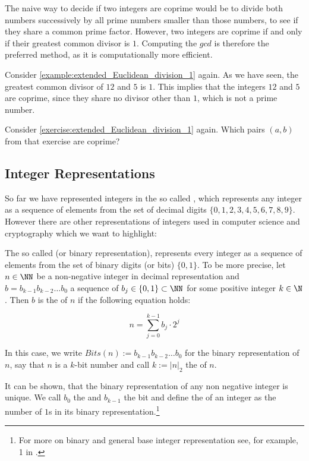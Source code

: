 The naive way to decide if two integers are coprime would be to divide both numbers successively by all prime numbers smaller than those numbers, to see if they share a common prime factor. However, two integers are coprime if and only if their greatest common divisor is $1$.  Computing the $gcd$ is therefore the preferred method, as it is computationally more efficient.

\begin{example} Consider \examplename{} \ref{example:extended_Euclidean_division_1} again. As we have seen, the greatest common divisor of $12$ and $5$ is $1$. This implies that the integers $12$ and $5$ are coprime, since they share no divisor other than $1$, which is not a prime number.
\end{example}
\begin{exercise} Consider \exercisename{} \ref{exercise:extended_Euclidean_division_1} again. Which pairs $(a,b)$ from that exercise are coprime?
\end{exercise}
\subsection{Integer Representations}
\label{sec:integer-rep}
So far we have represented integers in the so called , which represents any integer as a sequence of elements from the set of decimal digits $\{0,1,2,3,4,5,6,7,8,9\}$. However there are other representations of integers used in computer science and cryptography which we want to highlight:

The so called  (or binary representation), represents every integer as a sequence of elements from the set of binary digits (or bits) $\{0,1\}$. To be more precise, let $n\in\NN$ be a non-negative integer in decimal representation and $b=b_{k-1}b_{k-2}\ldots b_{0}$ a sequence of  $b_j\in\{0,1\}\subset\NN$ for some positive integer $k\in\N$. Then $b$ is the  of $n$ if the following equation holds:

\begin{equation}
\label{def:binary_representation_integer}
n = \sum_{j=0}^{k-1} b_j\cdot 2^j
\end{equation}

In this case, we write $Bits(n):= b_{k-1}b_{k-2}\ldots b_{0}$ for the binary representation of $n$, say that $n$ is a $k$-bit number and call $k:= |n|_2$ the  of $n$. 

It can be shown, that the binary representation of any non negative integer is unique. We call $b_0$ the  and $b_{k-1}$ the  bit and define the  of an integer as the number of $1$s in its binary representation.\footnote{For more on binary and general base integer representation see, for example, \chaptname{} 1 in \cite{mignotte-1992}.}

